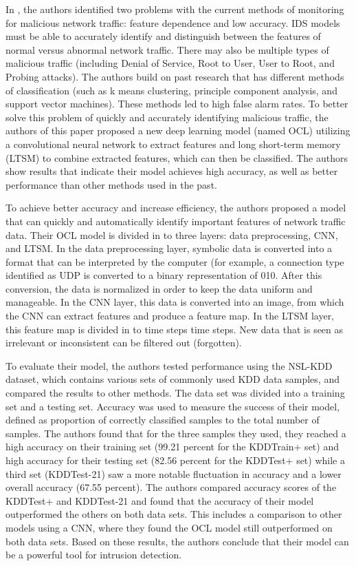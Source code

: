 In \cite{su19}, the authors identified two problems with the current methods of monitoring for malicious network traffic: feature dependence and low accuracy. IDS models must be able to accurately identify and distinguish between the features of normal versus abnormal network traffic. There may also be multiple types of malicious traffic (including Denial of Service, Root to User, User to Root, and Probing attacks). The authors build on past research that has different methods of classification (such as k means clustering, principle component analysis, and support vector machines). These methods led to high false alarm rates. To better solve this problem of quickly and accurately identifying malicious traffic, the authors of this paper proposed a new deep learning model (named OCL) utilizing a convolutional neural network to extract features and long short-term memory (LTSM) to combine extracted features, which can then be classified. The authors show results that indicate their model achieves high accuracy, as well as better performance than other methods used in the past. 

To achieve better accuracy and increase efficiency, the authors proposed a model that can quickly and automatically identify important features of network traffic data. Their OCL model is divided in to three layers: data preprocessing, CNN, and LTSM. In the data preprocessing layer, symbolic data is converted into a format that can be interpreted by the computer (for example, a connection type identified as UDP is converted to a binary representation of 010. After this conversion, the data is normalized in order to keep the data uniform and manageable. In the CNN layer, this data is converted into an image, from which the CNN can extract features and produce a feature map. In the LTSM layer, this feature map is divided in to time steps time steps. New data that is seen as irrelevant or inconsistent can be filtered out (forgotten). 

To evaluate their model, the authors tested performance using the NSL-KDD dataset, which contains various sets of commonly used KDD data samples, and compared the results to other methods. The data set was divided into a training set and a testing set. Accuracy was used to measure the success of their model, defined as proportion of correctly classified samples to the total number of samples. The authors found that for the three samples they used, they reached a high accuracy on their training set (99.21 percent for the KDDTrain+  set) and high accuracy for their testing set (82.56 percent for the KDDTest+ set) while a third set (KDDTest-21) saw a more notable fluctuation in accuracy and a lower overall accuracy (67.55 percent). The authors compared accuracy scores of the KDDTest+ and KDDTest-21 and found that the accuracy of their model outperformed the others on both data sets. This includes a comparison to other models using a CNN, where they found the OCL model still outperformed on both data sets. Based on these results, the authors conclude that their model can be a powerful tool for intrusion detection. 

